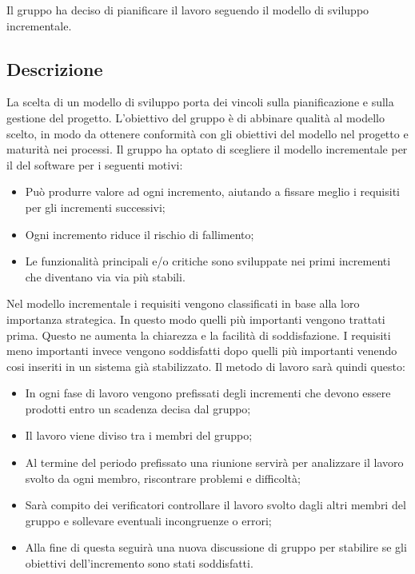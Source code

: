 Il gruppo \Gruppo{} ha deciso di pianificare il lavoro seguendo il modello di sviluppo incrementale.

\subsection{Descrizione}
La scelta di un modello di sviluppo porta dei vincoli sulla pianificazione e sulla gestione del progetto.
L’obiettivo del gruppo è di abbinare qualità al modello scelto, in modo da ottenere conformità con
gli obiettivi del modello nel progetto e maturità nei processi.
Il gruppo ha optato di scegliere il modello incrementale per il  del software per i seguenti
motivi:
\begin{itemize}
    \item Può produrre valore ad ogni incremento, aiutando a fissare meglio i requisiti per gli incrementi
    successivi;
    \item Ogni incremento riduce il rischio di fallimento;
    \item Le funzionalità principali e/o critiche sono sviluppate nei primi incrementi che diventano via via più stabili.
\end{itemize}



Nel modello incrementale i requisiti vengono classificati in base alla loro importanza strategica. In
questo modo quelli più importanti vengono trattati prima. Questo ne aumenta la chiarezza e la
facilità di soddisfazione. I requisiti meno importanti invece vengono soddisfatti dopo quelli più
importanti venendo cosi inseriti in un sistema già stabilizzato.
Il metodo di lavoro sarà quindi questo:
\begin{itemize}
    \item In ogni fase di lavoro vengono prefissati degli incrementi che devono essere prodotti entro un
    scadenza decisa dal gruppo;
    \item Il lavoro viene diviso tra i membri del gruppo;
    \item Al termine del periodo prefissato una riunione servirà per analizzare il lavoro svolto da ogni
    membro, riscontrare problemi e difficoltà;
    \item Sarà compito dei verificatori controllare il lavoro svolto dagli altri membri del gruppo e sollevare
    eventuali incongruenze o errori;
    \item Alla fine di questa  seguirà una nuova discussione di gruppo per stabilire se gli obiettivi
    dell’incremento sono stati soddisfatti.
\end{itemize}






